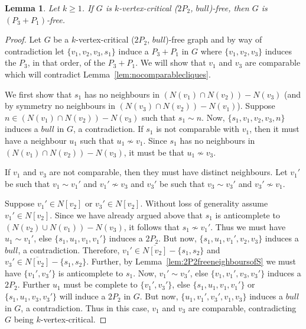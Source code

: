 \documentclass[11pt]{article}
\newtheorem{lemma}[theorem]{Lemma}
\theoremstyle{definition}
\begin{document}
\begin{lemma}\label{lem:2P2bullP3P1fee}
Let $k\ge 1$. If $G$ is $k$-vertex-critical ($2P_2$, $bull$)-free, then $G$ is $(P_3+ P_1)$-free.
\end{lemma}
\begin{proof}
Let $G$ be a $k$-vertex-critical ($2P_2$, $bull$)-free graph and by way of contradiction let $\{v_1,v_2,v_3,s_1\}$ induce a $P_3+P_1$ in $G$ where $\{v_1,v_2,v_3\}$ induces the $P_3$, in that order, of the $P_3+P_1$. We will show that $v_1$ and $v_3$ are comparable which will contradict Lemma~\ref{lem:nocomparablecliques}.


We first show that $s_1$ has no neighbours in $(N(v_1)\cap N(v_2))-N(v_3)$  (and by symmetry no neighbours in $(N(v_3)\cap N(v_2))-N(v_1)$). Suppose $n\in (N(v_1)\cap N(v_2))-N(v_3)$ such that $s_1\sim n$. Now, $\{s_1,v_1,v_2,v_3,n\}$ induces a $bull$ in $G$, a contradiction. If $s_1$ is not comparable with $v_1$, then it must have a neighbour $u_1$ such that $u_1\nsim v_1$. Since $s_1$ has  no neighbours in $(N(v_1)\cap N(v_2))-N(v_3)$, it must be that $u_1\nsim v_3$. %

If $v_1$ and $v_3$ are not comparable, then they must have distinct neighbours. Let $v_1'$ be such that $v_1\sim v_1'$ and $v_1'\nsim v_3$ and $v_3'$ be such that $v_3\sim v_3'$ and $v_3'\nsim v_1$. 

Suppose $v_1'\in N[v_2]$ or $v_3'\in N[v_2]$. Without loss of generality assume $v_1'\in N[v_2]$. Since we have already argued above that $s_1$ is anticomplete to $(N(v_2)\cup N(v_1))-N(v_3)$, it follows that $s_1\nsim v_1'$. Thus we must have $u_1\sim v_1'$, else $\{s_1,u_1,v_1,v_1'\}$ induces a $2P_2$. But now, $\{s_1,u_1,v_1',v_2,v_3\}$ induces a $bull$, a contradiction. Therefore,  $v_1'\in \overline{N[v_2]}-\{s_1,s_2\}$ and $v_3'\in \overline{N[v_2]}-\{s_1,s_2\}$. Further, by Lemma~\ref{lem:2P2freeneighboursofS} we must have $\{v_1',v_3'\}$ is anticomplete to $s_1$. Now, $v_1'\sim v_3'$, else $\{v_1,v_1',v_3,v_3'\}$ induces a $2P_2$. Further $u_1$ must be complete to $\{v_1',v_3'\}$, else $\{s_1,u_1,v_1,v_1'\}$ or $\{s_1,u_1,v_3,v_3'\}$ will induce a $2P_2$ in $G$. But now, $\{u_1,v_1',v_3',v_1,v_3\}$ induces a $bull$ in $G$, a contradiction. Thus in this case, $v_1$ and $v_3$ are comparable, contradicting $G$ being $k$-vertex-critical.

\end{proof}
\end{document}
